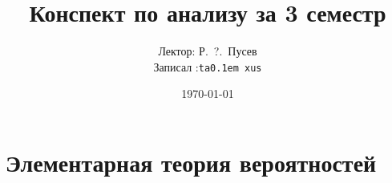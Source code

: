 \documentclass[12pt,ebook]{../notes}
\title{Конспект по анализу за 3 семестр}
\date{\today}
\author{Лектор: Р.~?.~Пусев \\
Записал :\texttt{ta\lower 0.1em \hbox{x}us}}
\begin{document}
 
\maketitle
\tableofcontents
\clearpage

\chapter{Элементарная теория вероятностей}


% 
\medskip
 


\end{document}
